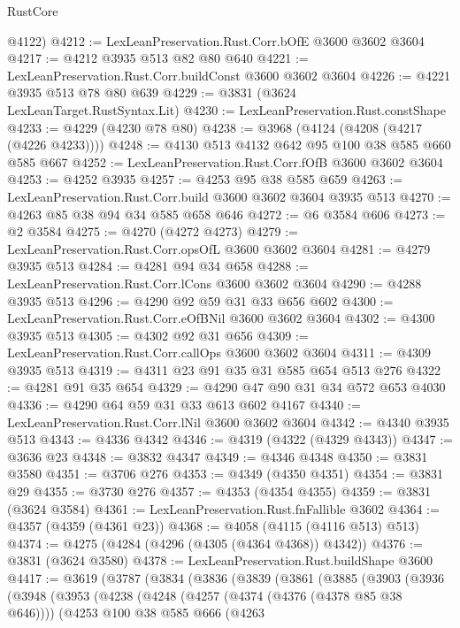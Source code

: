 \begin{lexlean}{RustCore}
\begin{coremodule}
      @4122)
@4212 := LexLeanPreservation.Rust.Corr.bOfE @3600 @3602 @3604
@4217 := @4212 @3935 @513 @82 @80 @640
@4221 := LexLeanPreservation.Rust.Corr.buildConst @3600 @3602 @3604
@4226 := @4221 @3935 @513 @78 @80 @639
@4229 := @3831 (@3624 LexLeanTarget.RustSyntax.Lit)
@4230 := LexLeanPreservation.Rust.constShape
@4233 := @4229 (@4230 @78 @80)
@4238 := @3968 (@4124 (@4208 (@4217 (@4226 @4233))))
@4248 := @4130 @513 @4132 @642 @95 @100 @38 @585 @660 @585 @667
@4252 := LexLeanPreservation.Rust.Corr.fOfB @3600 @3602 @3604
@4253 := @4252 @3935
@4257 := @4253 @95 @38 @585 @659
@4263 := LexLeanPreservation.Rust.Corr.build @3600 @3602 @3604 @3935 @513
@4270 := @4263 @85 @38 @94 @34 @585 @658 @646
@4272 := @6 @3584 @606
@4273 := @2 @3584
@4275 := @4270 (@4272 @4273)
@4279 := LexLeanPreservation.Rust.Corr.opsOfL @3600 @3602 @3604
@4281 := @4279 @3935 @513
@4284 := @4281 @94 @34 @658
@4288 := LexLeanPreservation.Rust.Corr.lCons @3600 @3602 @3604
@4290 := @4288 @3935 @513
@4296 := @4290 @92 @59 @31 @33 @656 @602
@4300 := LexLeanPreservation.Rust.Corr.eOfBNil @3600 @3602 @3604
@4302 := @4300 @3935 @513
@4305 := @4302 @92 @31 @656
@4309 := LexLeanPreservation.Rust.Corr.callOps @3600 @3602 @3604
@4311 := @4309 @3935 @513
@4319 := @4311 @23 @91 @35 @31 @585 @654 @513 @276
@4322 := @4281 @91 @35 @654
@4329 := @4290 @47 @90 @31 @34 @572 @653 @4030
@4336 := @4290 @64 @59 @31 @33 @613 @602 @4167
@4340 := LexLeanPreservation.Rust.Corr.lNil @3600 @3602 @3604
@4342 := @4340 @3935 @513
@4343 := @4336 @4342
@4346 := @4319 (@4322 (@4329 @4343))
@4347 := @3636 @23
@4348 := @3832 @4347
@4349 := @4346 @4348
@4350 := @3831 @3580
@4351 := @3706 @276
@4353 := @4349 (@4350 @4351)
@4354 := @3831 @29
@4355 := @3730 @276
@4357 := @4353 (@4354 @4355)
@4359 := @3831 (@3624 @3584)
@4361 := LexLeanPreservation.Rust.fnFallible @3602
@4364 := @4357 (@4359 (@4361 @23))
@4368 := @4058 (@4115 (@4116 @513) @513)
@4374 := @4275 (@4284 (@4296 (@4305 (@4364 @4368)) @4342))
@4376 := @3831 (@3624 @3580)
@4378 := LexLeanPreservation.Rust.buildShape @3600
@4417 := @3619
    (@3787
      (@3834
        (@3836
          (@3839
            (@3861
              (@3885
                (@3903
                  (@3936
                    (@3948
                      (@3953
                        (@4238
                          (@4248
                            (@4257 (@4374 (@4376 (@4378 @85 @38 @646))))
                            (@4253
                              @100
                              @38
                              @585
                              @666
                              (@4263

\end{coremodule}
\end{lexlean}
